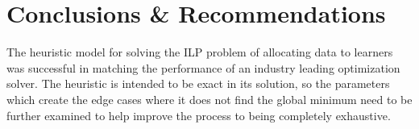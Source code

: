 \documentclass[../mthe-493-final-project.tex]{subfiles}
\begin{document}
    \chapter{Conclusions \& Recommendations}
    \label{ch:conclusions-and-recommendations}
    The heuristic model for solving the ILP problem of allocating data to learners was successful in matching the performance of an industry leading optimization solver. The heuristic is intended to be exact in its solution, so the parameters which create the edge cases where it does not find the global minimum need to be further examined to help improve the process to being completely exhaustive.
\end{document}
